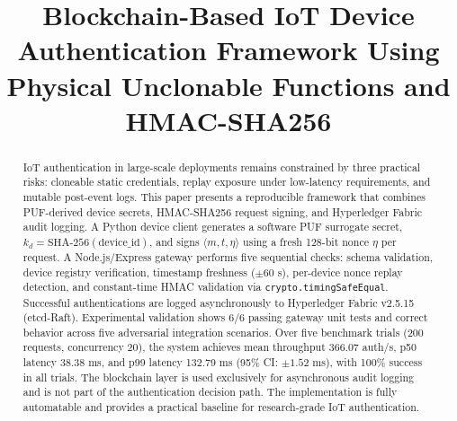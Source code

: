 \documentclass[conference]{IEEEtran}
\begin{document}
\title{Blockchain-Based IoT Device Authentication Framework Using\\
Physical Unclonable Functions and HMAC-SHA256}

\author{
}

\maketitle

\begin{abstract}
IoT authentication in large-scale deployments remains constrained by three
practical risks: cloneable static credentials, replay exposure under
low-latency requirements, and mutable post-event logs. This paper presents a
reproducible framework that combines PUF-derived device secrets, HMAC-SHA256
request signing, and Hyperledger Fabric audit logging. A Python device client
generates a software PUF surrogate secret,
$k_d=\mathrm{SHA\text{-}256}(\mathrm{device\_id})$, and signs
$\langle m,t,\eta\rangle$ using a fresh 128-bit nonce $\eta$ per request. A
Node.js/Express gateway performs five sequential checks: schema validation,
device registry verification, timestamp freshness ($\pm60$ s), per-device
nonce replay detection, and constant-time HMAC validation via
\texttt{crypto.timingSafeEqual}. Successful authentications are logged
asynchronously to Hyperledger Fabric v2.5.15 (etcd-Raft). Experimental
validation shows 6/6 passing gateway unit tests and correct behavior across
five adversarial integration scenarios. Over five benchmark trials (200
requests, concurrency 20), the system achieves mean throughput 366.07 auth/s,
p50 latency 38.38 ms, and p99 latency 132.79 ms (95\% CI: $\pm1.52$ ms), with
100\% success in all trials. The blockchain layer is used exclusively for asynchronous audit logging and is not part of the authentication decision path.
The implementation is fully automatable and provides a practical baseline for
research-grade IoT authentication.
\end{abstract}
\end{document}

